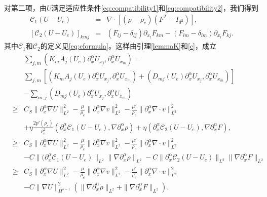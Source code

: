 \documentclass{article}
\begin{document}
对第二项，由$U$满足适应性条件\eqref{eq:compatibility1}和\eqref{eq:compatibility2}，我们得到
\begin{eqnarray} \label{c}
{\mathcal C}_1(U - U_e) &=& \nabla\cdot[(\rho - \rho_e)(F^T - I_{d^2})], \nonumber\\[2mm]
{[{\mathcal C}_2(U - U_e)]}_{kmj} &=& (F_{lj} - \delta_{lj})\partial_{x_l}F_{km} - (F_{lm} - \delta_{lm})\partial_{x_l}F_{kj}.
\end{eqnarray}
其中${\mathcal C}_1$和${\mathcal C}_2$的定义见\eqref{eq:cformula}。这样由引理\ref{lemmaK}和\eqref{c}，成立
\begin{eqnarray}\label{eq:L2com}
 && \sum_{j,m} (K_m A_j(U_e) \partial_x^\alpha U_{x_j}, \partial_x^\alpha U_{x_m}) = \\
  &&\sum_{j,m}[ (K_m A_j(U_e) \partial_x^\alpha U_{x_j}, \partial_x^\alpha U_{x_m}) + (D_{mj}(U_e) \partial_x^\alpha U_{x_j}, \partial_x^\alpha U_{x_m}) ] \nonumber \\
  && - \sum_{m,j} (D_{mj}(U_e) \partial_x^\alpha  U_{x_j}, \partial_x^\alpha U_{x_m}) \nonumber \\
   &\ge& C_S \|\partial_x^\alpha \nabla U\|_{L^2}^2 - \frac{\mu}{\rho_e} \|\partial_x^\alpha \nabla  v \|_{L^2}^2 -\frac{\mu'}{\rho_e} \|\partial_x^\alpha \nabla \cdot  v \|_{L^2}^2\nonumber \\
  &&+ \eta\frac{2p'(\rho_e)}{\rho_e^2}(\partial_x^\alpha{\mathcal C}_1(U - U_e), \nabla \partial_x^\alpha\rho) + \eta(\partial_x^\alpha{\mathcal C}_2(U - U_e), \nabla \partial_x^\alpha F), \nonumber\\
  &\ge& C_S \|\partial_x^\alpha \nabla U\|_{L^2}^2 - \frac{\mu}{\rho_e} \|\partial_x^\alpha \nabla  v \|_{L^2}^2 -\frac{\mu'}{\rho_e} \|\partial_x^\alpha \nabla \cdot  v \|_{L^2}^2\nonumber \\
  &&- C\|(\partial_x^\alpha{\mathcal C}_1(U - U_e)\|_{L^2}\|\nabla \partial_x^\alpha\rho\|_{L^2} - C\|\partial_x^\alpha{\mathcal C}_2(U - U_e)\|_{L^2}\|\nabla \partial_x^\alpha F\|_{L^2}\nonumber\\
  &\ge& C_S \|\partial_x^\alpha \nabla U\|_{L^2}^2  - \frac{\mu}{\rho_e} \|\partial_x^\alpha \nabla  v \|_{L^2}^2 -\frac{\mu'}{\rho_e} \|\partial_x^\alpha \nabla \cdot  v \|_{L^2}^2\nonumber \\
  &&- C\|\nabla U\|_{H^{s-1}}^2(\|\nabla \partial_x^\alpha\rho\|_{L^2} + \|\nabla \partial_x^\alpha F\|_{L^2}). \nonumber
\end{eqnarray}
\end{document}
